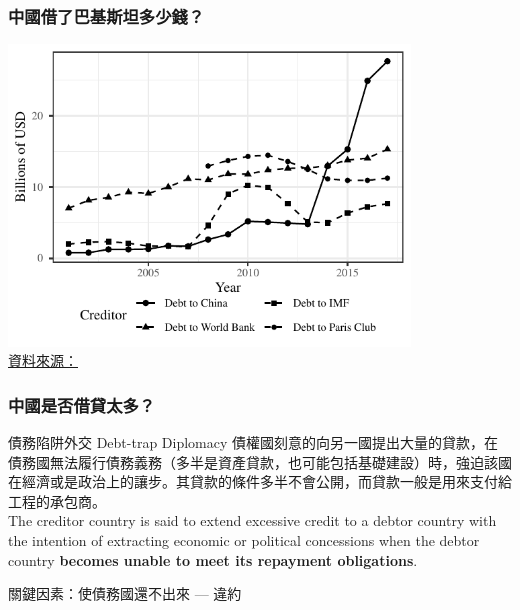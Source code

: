 \documentclass[mathserif]{beamer}
\begin{document}
    \begin{frame}[label = {pak_ts}]
        \frametitle{中國借了巴基斯坦多少錢？}
        \begin{center}
            \includegraphics[width = 0.8\textwidth]{fig/ALL/Pakistan_debt_source.pdf}\\
            \small \hyperlink{pak_ds}{資料來源：}\citet*{Horn-Reinhart-Trebesch-21}
        \end{center}
    \end{frame}

    \begin{frame}
        \frametitle{中國是否借貸太多？}
            \begin{block}{債務陷阱外交 Debt-trap Diplomacy}
               債權國刻意的向另一國提出大量的貸款，在債務國無法履行債務義務（多半是資產貸款，也可能包括基礎建設）時，強迫該國在經濟或是政治上的讓步。其貸款的條件多半不會公開，而貸款一般是用來支付給工程的承包商。\\
               The creditor country is said to extend excessive credit to a debtor country with the intention of extracting economic or political concessions when the debtor country \textbf{becomes unable to meet its repayment obligations}.
            \end{block}
            \pause
            \vfill
            關鍵因素：使債務國還不出來 --- 違約
    \end{frame}
\end{document}
